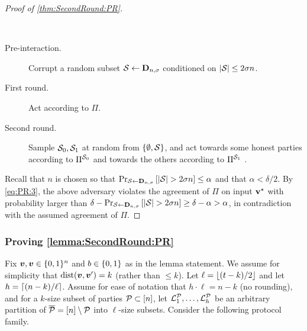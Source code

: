 \begin{proof}[Proof of \cref{thm:SecondRound:PR}]
{\begin{algorithm}[$\Ac$]~
\begin{description}
	\item[Pre-interaction.]
	Corrupt a random subset $\mathcal{S} \gets \mathbf{D}_{n,\sigma} $ conditioned on $\left|{\cal{S}}\right| \le 2\sigma n$.
	
	
	\item[First round.] Act according to $\Pi$.
	\item[Second round.] Sample ${\cal{S}}_0,{\cal{S}}_1$ at random from $\left\{\emptyset,{\cal{S}}\right\}$, and act towards some honest parties according to $\Pi^{{\cal{S}}_0}$ and towards the others according to $\Pi^{{\cal{S}}_1}$ .
\end{description}
\end{algorithm}
}
Recall that $n$ is chosen so that $\Pr_{{\cal{S}} \gets \mathbf{D}_{n,\sigma}}\left[\left|{\cal{S}}\right| >2\sigma n\right] \leq \alpha$ and that $\alpha < \delta/2$.
By \cref{eq:PR:3}, the above adversary violates the agreement of $\Pi$ on input $\mathbf{v}^{\star}$ with probability larger than $\delta - \Pr_{{\cal{S}} \gets \mathbf{D}_{n,\sigma}}\left[\left|{\cal{S}}\right| >2\sigma n\right] \ge \delta - \alpha >\alpha$, in contradiction with the assumed agreement of $\Pi$.
\end{proof}


\newcommand{\VV}{\cV^{\cP}}
\renewcommand{\PP}{\Pi^{\cP,\cS}}
\newcommand{\ops}{{\overline{\cP \cup \cS}}}

\subsubsection{Proving \cref{lemma:SecondRound:PR}}\label{sec:lemma:SecondRound:PR}
Fix ${ \boldsymbol{v}},{ \boldsymbol{v}} \in {\{0,1\}^n}$ and $b\in \{0,1\}$ as in the lemma statement. We assume for simplicity that $\mathrm{dist}({ \boldsymbol{v}},{ \boldsymbol{v}}')=k$ (rather than $\le k$).
Let $\ell= \left \lfloor(t -k)/2 \right \rfloor$ and let $h = \left\lceil (n-k)/\ell \right\rceil$. Assume for ease of notation that $h\cdot \ell = n-k $ (\ie no rounding), and for a $k$-size subset of parties $\mathcal{P} \subset [n]$, let $ {\cal{L}}^{\mathcal{P}}_1,\dots,{\cal{L}}_h^{\mathcal{P}}$ be an arbitrary partition of ${\overline{\mathcal{P}}} = [n] \setminus \mathcal{P}$ into $\ell$-size subsets. Consider the following protocol family.

